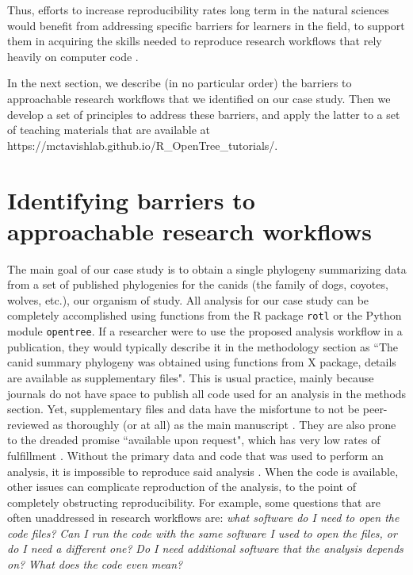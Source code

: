 \documentclass[12pt]{article}
\begin{document}
Thus, efforts to increase reproducibility rates long term in the natural sciences would benefit from addressing specific barriers for learners in the field, to support them in acquiring the skills needed to reproduce research workflows that rely heavily on computer code \citep{peng2011reproducible, sandve2013ten, powers2019open}.

In the next section, we describe (in no particular order) the barriers to approachable research workflows that we identified on our case study.
Then we develop a set of principles to address these barriers, and apply the latter to a set of teaching materials that are available at https://mctavishlab.github.io/R\_OpenTree\_tutorials/.


\section*{Identifying barriers to approachable research workflows}
\label{sec:identifying}


The main goal of our case study is to obtain a single phylogeny summarizing data from a set of published phylogenies for the canids (the family of dogs, coyotes, wolves, etc.), our organism of study.
All analysis for our case study can be completely accomplished using functions from the R package \texttt{rotl} or the Python module \texttt{opentree}.
If a researcher were to use the proposed analysis workflow in a publication, they would typically describe it in the methodology section as ``The canid summary phylogeny was obtained using functions from X package, details are available as supplementary files".
This is usual practice, mainly because journals do not have space to publish all code used for an analysis in the methods section. Yet, supplementary files and data have the misfortune to not be peer-reviewed as thoroughly (or at all) as the main manuscript \citep{pop2015use}.
They are also prone to the dreaded promise ``available upon request", which has very low rates of fulfillment \citep{krawczyk2012available}.
Without the primary data and code that was used to perform an analysis, it is impossible to reproduce said analysis \citep{miyakawa2020no}. When the code is available, other issues can complicate reproduction of the analysis, to the point of completely obstructing reproducibility.
For example, some questions that are often unaddressed in research workflows are:
\textit{what software do I need to open the code files?}
\textit{Can I run the code with the same software I used to open the files, or do I need a different one?}
\textit{Do I need additional software that the analysis depends on?}
\textit{What does the code even mean?}
\end{document}
